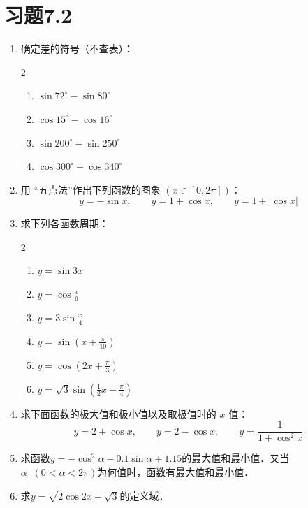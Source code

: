 \section*{习题7.2}
\begin{enumerate}
    \item 确定差的符号（不查表）：
 \begin{multicols}{2}
\begin{enumerate}
    \item     $\sin 72^{\circ}-\sin 80^{\circ}$
    \item  $\cos 15^{\circ}-\cos 16^{\circ}$
    \item  $\sin 200^{\circ}-\sin 250^{\circ}$
    \item  $\cos 300^{\circ}-\cos 340^{\circ}$
\end{enumerate}
 \end{multicols}

 \item 用 “五点法”作出下列函数的图象 $(x \in [0,2\pi])$：
$$y=-\sin x,     \qquad y=1+\cos x,\qquad  y=1+|\cos x|$$


\item 求下列各函数周期：
\begin{multicols}{2}
\begin{enumerate}
    \item $y=\sin 3 x$
    \item $y=\cos \frac{x}{6}$
    \item $y=3 \sin \frac{x}{4}$
    \item $y=\sin \left(x+\frac{\pi}{10}\right)$
    \item $y=\cos \left(2 x+\frac{\pi}{3}\right)$
    \item $y=\sqrt{3} \sin \left(\frac{1}{2} x-\frac{\pi}{4}\right) $
\end{enumerate}
\end{multicols}

    
    \item 求下面函数的极大值和极小值以及取极值时的 $x$ 值：
    $$ y=2+\cos x, \qquad y=2-\cos x,\qquad y=\frac{1}{1+\cos^2 x}$$

\item 求函数$y=-\cos^2\alpha -0.1\sin\alpha+1.15$的最大值和最小值．又当
$\alpha\;\; (0<\alpha<2\pi)$为何值时，函数有最大值和最小值．

\item 求$y=\sqrt{2\cos 2x-\sqrt{3}}$的定义域．

\end{enumerate}

